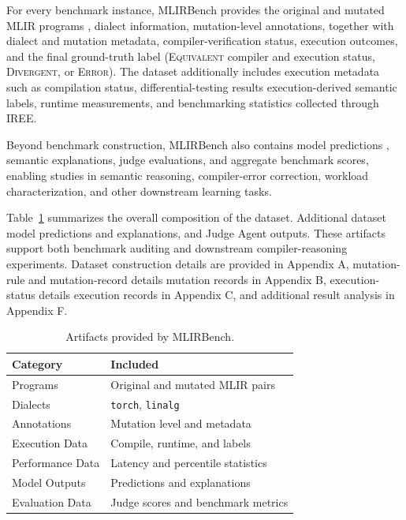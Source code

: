\documentclass[sigplan,screen,review,anonymous]{acmart}
\providecommand{\DIFadd}[1]{{\protect\color{blue} \sf #1}} %
\providecommand{\DIFdel}[1]{{\protect\color{red} \scriptsize #1}} %
\providecommand{\DIFaddbegin}{} %
\providecommand{\DIFaddend}{} %
\providecommand{\DIFdelbegin}{} %
\providecommand{\DIFdelend}{} %
\begin{document}
\DIFdel{For every benchmark instance, MLIRBench provides the original and }\DIFdelend mutated MLIR programs \DIFdelbegin \DIFdel{, dialect information, mutation-level annotations, }\DIFdelend \DIFaddbegin \DIFadd{together with
dialect and }\DIFaddend mutation metadata, \DIFdelbegin \DIFdel{compiler-verification status, execution outcomes, and the final ground-truth label (\textsc{Equivalent}}\DIFdelend \DIFaddbegin \DIFadd{compiler and execution status}\DIFaddend , \DIFdelbegin \DIFdel{\textsc{Divergent}, or \textsc{Error}). The dataset additionally includes execution metadata such as compilation status, differential-testing results}\DIFdelend \DIFaddbegin \DIFadd{execution-derived
semantic labels}\DIFaddend , runtime measurements, \DIFdelbegin \DIFdel{and benchmarking statistics collected through IREE.
}%

\DIFdel{Beyond benchmark construction, MLIRBench also contains model predictions , semantic explanations,
judge evaluations, and aggregate benchmark scores, enabling studies in semantic reasoning, compiler-error correction, workload characterization, and
other downstream learning tasks. }%

\DIFdel{Table~\ref{tab:dataset_contents} summarizes the overall composition of the dataset. Additional dataset }\DIFdelend \DIFaddbegin \DIFadd{model predictions and explanations,
and Judge Agent outputs. These artifacts support both benchmark auditing and
downstream compiler-reasoning experiments. Dataset }\DIFaddend construction details are
provided in Appendix A, \DIFdelbegin \DIFdel{mutation-rule and mutation-record details }\DIFdelend \DIFaddbegin \DIFadd{mutation records }\DIFaddend in Appendix B, \DIFdelbegin \DIFdel{execution-status details }\DIFdelend \DIFaddbegin \DIFadd{execution records }\DIFaddend in
Appendix C, and additional \DIFdelbegin \DIFdel{result }\DIFdelend analysis in Appendix F.

\begin{table}[t]
\centering
\caption{Artifacts provided by MLIRBench.}
\label{tab:dataset_contents}
\begin{tabular}{ll}
\toprule
\textbf{Category} & \textbf{Included} \\
\midrule
Programs & Original and mutated MLIR pairs \\
Dialects & \texttt{torch}, \texttt{linalg} \\
Annotations & Mutation level and metadata \\
Execution Data & Compile, runtime, and labels \\
Performance Data & Latency and percentile statistics \\
Model Outputs & Predictions and explanations \\
Evaluation Data & Judge scores and benchmark metrics \\
\bottomrule
\end{tabular}
\end{table}
\end{document}
